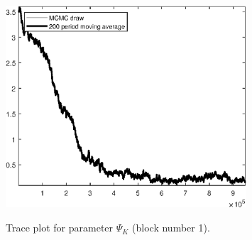 \begin{figure}[H]
\centering
  \includegraphics[width=0.8\textwidth]{BRS_growth_util_sectoral/graphs/TracePlot_Psi_K_blck_1}\\
    \caption{Trace plot for parameter ${\Psi_K}$ (block number 1).}
\end{figure}
